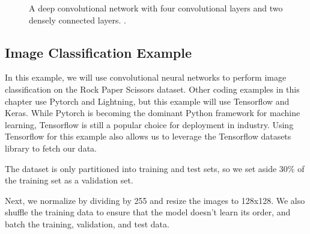 \documentclass{article}
\begin{document}
\begin{figure}[h!]
\begin{centering}
    \caption{A deep convolutional network with four convolutional layers and two densely connected layers. {\protect\cite{neutelings_tikz_2022}.}}
  
    \end{centering}
\end{figure}

\FloatBarrier

\subsection{Image Classification Example}

In this example, we will use convolutional neural networks to perform image classification on the Rock Paper Scissors dataset. Other coding examples in this chapter use Pytorch and Lightning, but this example will use Tensorflow and Keras. While Pytorch is becoming the dominant Python framework for machine learning, Tensorflow is still a popular choice for deployment in industry. Using Tensorflow for this example also allows us to leverage the Tensorflow datasets library to fetch our data.



The dataset is only partitioned into training and test sets, so we set aside 30\% of the training set as a validation set.



Next, we normalize by dividing by 255 and resize the images to 128x128. We also shuffle the training data to ensure that the model doesn't learn its order, and batch the training, validation, and test data.
\end{document}
